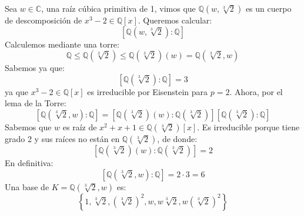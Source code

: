 \begin{ejemplo}
    Sea $w\in \mathbb{C}$, una raíz cúbica primitiva de 1, vimos que $\mathbb{Q}(w,\sqrt[3]{2})$ es un cuerpo de descomposición de $x^3-2\in \mathbb{Q}[x]$. Queremos calcular:
    \begin{equation*}
        \left[\mathbb{Q}\left(w, \sqrt[3]{2}\right):\mathbb{Q}\right]
    \end{equation*}
    Calculemos mediante una torre:
    \begin{equation*}
        \mathbb{Q} \leq \mathbb{Q}\left(\sqrt[3]{2}\right) \leq \mathbb{Q}\left(\sqrt[3]{2}\right)(w) = \mathbb{Q}\left(\sqrt[3]{2}, w\right)
    \end{equation*}
    Sabemos ya que:
    \begin{equation*}
        \left[\mathbb{Q}\left(\sqrt[3]{2}\right):\mathbb{Q}\right] = 3
    \end{equation*}
    ya que $x^3-2\in \mathbb{Q}[x]$  es irreducible por Eisenstein para $p=2$. Ahora, por el lema de la Torre:
    \begin{equation*}
        \left[\mathbb{Q}\left(\sqrt[3]{2},w\right):\mathbb{Q}\right] = \left[\mathbb{Q}\left(\sqrt[3]{2}\right)(w) : \mathbb{Q}\left(\sqrt[3]{2}\right)\right]\left[\mathbb{Q}\left(\sqrt[3]{2}\right):\mathbb{Q}\right]
    \end{equation*}
    Sabemos que $w$ es raíz de $x^2+x+1\in \mathbb{Q}\left(\sqrt[3]{2}\right)[x]$. Es irreducible porque tiene grado 2 y sus raíces no están en $\mathbb{Q}\left(\sqrt[3]{2}\right)$, de donde:
    \begin{equation*}
        \left[\mathbb{Q}\left(\sqrt[3]{2}\right)(w) : \mathbb{Q}\left(\sqrt[3]{2}\right)\right] = 2
    \end{equation*}
    En definitiva:
    \begin{equation*}
        \left[\mathbb{Q}\left(\sqrt[3]{2},w\right):\mathbb{Q}\right] = 2\cdot 3 = 6
    \end{equation*}
    Una base de $K=\mathbb{Q}\left(\sqrt[3]{2},w\right)$ es:
    \begin{equation*}
        \left\{1, \sqrt[3]{2}, {\left(\sqrt[3]{2}\right)}^{2}, w, w\sqrt[3]{2}, w{\left(\sqrt[3]{2}\right)}^{2}\right\}
    \end{equation*}
\end{ejemplo}

